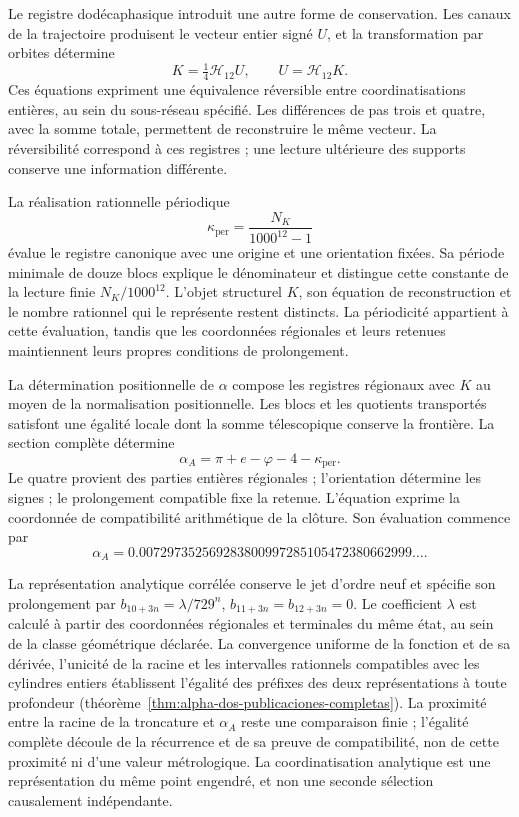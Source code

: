Le registre dodécaphasique introduit une autre forme de conservation. Les canaux de la trajectoire produisent le vecteur entier signé \(U\), et la transformation par orbites détermine
\[
 K=\tfrac14\mathcal H_{12}U,\qquad U=\mathcal H_{12}K.
\]
Ces équations expriment une équivalence réversible entre coordinatisations entières, au sein du sous-réseau spécifié. Les différences de pas trois et quatre, avec la somme totale, permettent de reconstruire le même vecteur. La réversibilité correspond à ces registres ; une lecture ultérieure des supports conserve une information différente.

La réalisation rationnelle périodique
\[
 \kappa_{\mathrm{per}}=\frac{N_K}{1000^{12}-1}
\]
évalue le registre canonique avec une origine et une orientation fixées. Sa période minimale de douze blocs explique le dénominateur et distingue cette constante de la lecture finie \(N_K/1000^{12}\). L'objet structurel \(K\), son équation de reconstruction et le nombre rationnel qui le représente restent distincts. La périodicité appartient à cette évaluation, tandis que les coordonnées régionales et leurs retenues maintiennent leurs propres conditions de prolongement.

La détermination positionnelle de \(\alpha\) compose les registres régionaux avec \(K\) au moyen de la normalisation positionnelle. Les blocs et les quotients transportés satisfont une égalité locale dont la somme télescopique conserve la frontière. La section complète détermine
\[
 \alpha_A=\pi+e-\varphi-4-\kappa_{\mathrm{per}}.
\]
Le quatre provient des parties entières régionales ; l'orientation détermine les signes ; le prolongement compatible fixe la retenue. L'équation exprime la coordonnée de compatibilité arithmétique de la clôture. Son évaluation commence par
\[
 \alpha_A=0.007297352569283800997285105472380662999\ldots.
\]

La représentation analytique corrélée conserve le jet d'ordre neuf
et spécifie son prolongement par
\(b_{10+3n}=\lambda/729^n\), \(b_{11+3n}=b_{12+3n}=0\).
Le coefficient \(\lambda\) est calculé à partir des coordonnées régionales et
terminales du même état, au sein de la classe géométrique déclarée.
La convergence uniforme de la fonction et de sa dérivée, l'unicité de la
racine et les intervalles rationnels compatibles avec les cylindres entiers
établissent l'égalité des préfixes des deux représentations à toute profondeur
(théorème~\ref{thm:alpha-dos-publicaciones-completas}). La proximité entre
la racine de la troncature et \(\alpha_A\) reste une comparaison finie ;
l'égalité complète découle de la récurrence et de sa preuve de
compatibilité, non de cette proximité ni d'une valeur métrologique.
La coordinatisation analytique est une représentation du même point engendré,
et non une seconde sélection causalement indépendante.

